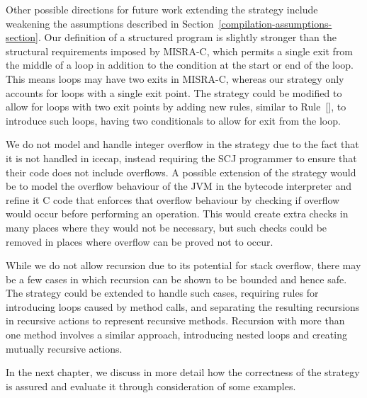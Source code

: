 Other possible directions for future work extending the strategy
include weakening the assumptions described in
Section~\ref{compilation-assumptions-section}.
Our definition of a structured program is slightly stronger than the
structural requirements imposed by MISRA-C, which permits a single
exit from the middle of a loop in addition to the condition at the
start or end of the loop.
This means loops may have two exits in MISRA-C, whereas our strategy
only accounts for loops with a single exit point.
The strategy could be modified to allow for loops with two exit points
by adding new rules, similar to
Rule~[], to introduce such loops,
having two conditionals to allow for exit from the loop.

We do not model and handle integer overflow in the strategy due to the
fact that it is not handled in icecap, instead requiring the SCJ
programmer to ensure that their code does not include overflows.
A possible extension of the strategy would be to model the overflow
behaviour of the JVM in the bytecode interpreter and refine it C code
that enforces that overflow behaviour by checking if overflow would
occur before performing an operation.
This would create extra checks in many places where they would not be
necessary, but such checks could be removed in places where overflow
can be proved not to occur.

While we do not allow recursion due to its potential for stack
overflow, there may be a few cases in which recursion can be shown to
be bounded and hence safe.
The strategy could be extended to handle such cases, requiring rules
for introducing loops caused by method calls, and separating the
resulting recursions in recursive actions to represent recursive
methods.
Recursion with more than one method involves a similar approach,
introducing nested loops and creating mutually recursive actions.


In the next chapter, we discuss in more detail how the correctness of
the strategy is assured and evaluate it through consideration of some
examples.

